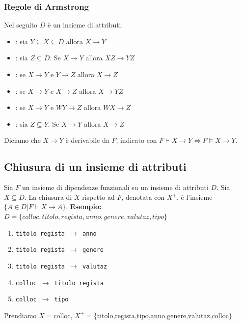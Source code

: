 \documentclass[12pt, a4paper]{report}
\begin{document}
    \subsubsection{Regole di Armstrong}
    Nel seguito $D$ è un insieme di attributi:
    \begin{itemize}
        \item {}: sia $Y \subseteq X \subseteq D$ allora $X \rightarrow Y$
        \item {}: sia $Z\subseteq D$. Se $X \rightarrow Y$ allora $XZ \rightarrow YZ$
        \item {}: se $X \rightarrow Y$ e $Y \rightarrow Z$ allora $X \rightarrow Z$
        \item {}: se $X \rightarrow Y$ e $X \rightarrow Z$ allora $X \rightarrow YZ$
        \item {}: se $X \rightarrow Y$ e $WY \rightarrow Z$ allora $WX \rightarrow Z$
        \item {}: sia $Z\subseteq Y$. Se $X \rightarrow Y$ allora $X \rightarrow Z$
    \end{itemize}
    Diciamo che $X\rightarrow Y$ è derivabile da $F$, indicato con $F \vdash X \rightarrow Y \iff F \models X\rightarrow Y$.
    \subsection{Chiusura di un insieme di attributi}
    Sia $F$ un insieme di dipendenze funzionali su un insieme di attributi $D$. Sia $X\subseteq D$. La chiusura di $X$ rispetto ad $F$, denotata con $X^{+}$, è l'insieme $\{A\in D|F\vdash X\rightarrow A\}$.
    \textbf{Esempio:}
    $D=\{colloc,titolo,regista,anno,genere,valutaz,tipo\}$
    \begin{enumerate}
        \item \texttt{titolo regista $\rightarrow$ anno}
        \item \texttt{titolo regista $\rightarrow$ genere}
        \item \texttt{titolo regista $\rightarrow$ valutaz}
        \item \texttt{colloc $\rightarrow$ titolo regista}
        \item \texttt{colloc $\rightarrow$ tipo}
    \end{enumerate}
    Prendiamo $X=\text{colloc}$, $X^{+}={\text{\{titolo,regista,tipo,anno,genere,valutaz,colloc\}}}$
\end{document}
